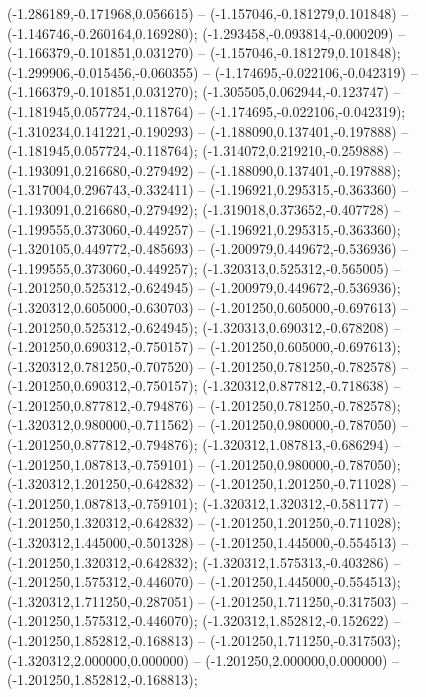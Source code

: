  (-1.286189,-0.171968,0.056615) -- (-1.157046,-0.181279,0.101848) -- (-1.146746,-0.260164,0.169280);
 (-1.293458,-0.093814,-0.000209) -- (-1.166379,-0.101851,0.031270) -- (-1.157046,-0.181279,0.101848);
 (-1.299906,-0.015456,-0.060355) -- (-1.174695,-0.022106,-0.042319) -- (-1.166379,-0.101851,0.031270);
 (-1.305505,0.062944,-0.123747) -- (-1.181945,0.057724,-0.118764) -- (-1.174695,-0.022106,-0.042319);
 (-1.310234,0.141221,-0.190293) -- (-1.188090,0.137401,-0.197888) -- (-1.181945,0.057724,-0.118764);
 (-1.314072,0.219210,-0.259888) -- (-1.193091,0.216680,-0.279492) -- (-1.188090,0.137401,-0.197888);
 (-1.317004,0.296743,-0.332411) -- (-1.196921,0.295315,-0.363360) -- (-1.193091,0.216680,-0.279492);
 (-1.319018,0.373652,-0.407728) -- (-1.199555,0.373060,-0.449257) -- (-1.196921,0.295315,-0.363360);
 (-1.320105,0.449772,-0.485693) -- (-1.200979,0.449672,-0.536936) -- (-1.199555,0.373060,-0.449257);
 (-1.320313,0.525312,-0.565005) -- (-1.201250,0.525312,-0.624945) -- (-1.200979,0.449672,-0.536936);
 (-1.320312,0.605000,-0.630703) -- (-1.201250,0.605000,-0.697613) -- (-1.201250,0.525312,-0.624945);
 (-1.320313,0.690312,-0.678208) -- (-1.201250,0.690312,-0.750157) -- (-1.201250,0.605000,-0.697613);
 (-1.320312,0.781250,-0.707520) -- (-1.201250,0.781250,-0.782578) -- (-1.201250,0.690312,-0.750157);
 (-1.320312,0.877812,-0.718638) -- (-1.201250,0.877812,-0.794876) -- (-1.201250,0.781250,-0.782578);
 (-1.320312,0.980000,-0.711562) -- (-1.201250,0.980000,-0.787050) -- (-1.201250,0.877812,-0.794876);
 (-1.320312,1.087813,-0.686294) -- (-1.201250,1.087813,-0.759101) -- (-1.201250,0.980000,-0.787050);
 (-1.320312,1.201250,-0.642832) -- (-1.201250,1.201250,-0.711028) -- (-1.201250,1.087813,-0.759101);
 (-1.320312,1.320312,-0.581177) -- (-1.201250,1.320312,-0.642832) -- (-1.201250,1.201250,-0.711028);
 (-1.320312,1.445000,-0.501328) -- (-1.201250,1.445000,-0.554513) -- (-1.201250,1.320312,-0.642832);
 (-1.320312,1.575313,-0.403286) -- (-1.201250,1.575312,-0.446070) -- (-1.201250,1.445000,-0.554513);
 (-1.320312,1.711250,-0.287051) -- (-1.201250,1.711250,-0.317503) -- (-1.201250,1.575312,-0.446070);
 (-1.320312,1.852812,-0.152622) -- (-1.201250,1.852812,-0.168813) -- (-1.201250,1.711250,-0.317503);
 (-1.320312,2.000000,0.000000) -- (-1.201250,2.000000,0.000000) -- (-1.201250,1.852812,-0.168813);
